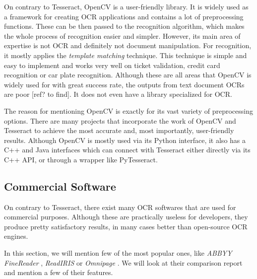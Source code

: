 On contrary to Tesseract, OpenCV is a user-friendly library. It is widely used as a framework for creating OCR applications and contains a lot of preprocessing functions. These can be then passed to the recognition algorithm, which makes the whole process of recognition easier and simpler. However, its main area of expertise is not OCR and definitely not document manipulation. For recognition, it mostly applies the \emph{template matching} technique. This technique is simple and easy to implement and works very well on ticket validation, credit card recognition or car plate recognition. Although these are all areas that OpenCV is widely used for with great success rate, the outputs from text document OCRs are poor [ref? to find]. It does not even have a library specialized for OCR.

The reason for mentioning OpenCV is exactly for its vast variety of preprocessing options. There are many projects that incorporate the work of OpenCV and Tesseract to achieve the most accurate and, most importantly, user-friendly results. Although OpenCV is mostly used via its Python interface, it also has a C++ and Java interfaces which can connect with Tesseract either directly via its C++ API, or through a wrapper like PyTesseract.

\subsection{Commercial Software}


On contrary to Tesseract, there exist many OCR softwares that are used for commercial purposes. Although these are practically useless for developers, they produce pretty satisfactory results, in many cases better than open-source OCR engines.

In this section, we will mention few of the most popular ones, like \emph{ABBYY FineReader} \citep{Finereader}, \emph{ReadIRIS} \citep{ReadIris} or \emph{Omnipage} \citep{Omnipage}. We will look at their comparison report and mention a few of their features.

